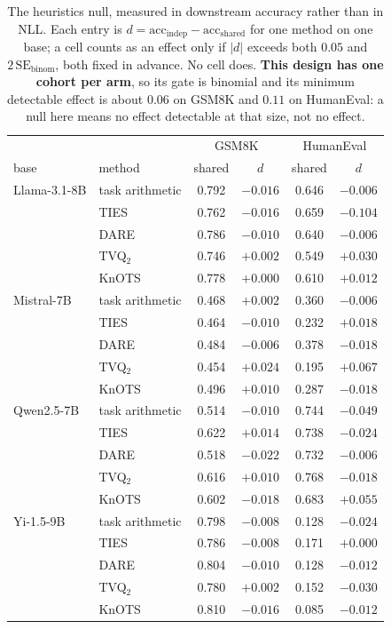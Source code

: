 \begin{table}[t]
\centering
\small
\caption{The heuristics null, measured in downstream accuracy rather than in
NLL. Each entry is $d = \mathrm{acc}_{\mathrm{indep}} -
\mathrm{acc}_{\mathrm{shared}}$ for one method on one base; a cell counts as an
effect only if $|d|$ exceeds both $0.05$ and $2\,\mathrm{SE}_{\mathrm{binom}}$,
both fixed in advance. No cell does. \textbf{This design has one cohort per
arm}, so its gate is binomial and its minimum detectable effect is about
$0.06$ on GSM8K and $0.11$ on HumanEval: a null here means no effect detectable
at that size, not no effect.}
\label{tab:heur-downstream}
\begin{tabular}{llcccc}
\toprule
 & & \multicolumn{2}{c}{GSM8K} & \multicolumn{2}{c}{HumanEval} \\
base & method & shared & $d$ & shared & $d$ \\
\midrule
Llama-3.1-8B & task arithmetic & 0.792 & $-0.016$ & 0.646 & $-0.006$ \\
 & TIES & 0.762 & $-0.016$ & 0.659 & $-0.104$ \\
 & DARE & 0.786 & $-0.010$ & 0.640 & $-0.006$ \\
 & TVQ$_2$ & 0.746 & $+0.002$ & 0.549 & $+0.030$ \\
 & KnOTS & 0.778 & $+0.000$ & 0.610 & $+0.012$ \\
\addlinespace
Mistral-7B & task arithmetic & 0.468 & $+0.002$ & 0.360 & $-0.006$ \\
 & TIES & 0.464 & $-0.010$ & 0.232 & $+0.018$ \\
 & DARE & 0.484 & $-0.006$ & 0.378 & $-0.018$ \\
 & TVQ$_2$ & 0.454 & $+0.024$ & 0.195 & $+0.067$ \\
 & KnOTS & 0.496 & $+0.010$ & 0.287 & $-0.018$ \\
\addlinespace
Qwen2.5-7B & task arithmetic & 0.514 & $-0.010$ & 0.744 & $-0.049$ \\
 & TIES & 0.622 & $+0.014$ & 0.738 & $-0.024$ \\
 & DARE & 0.518 & $-0.022$ & 0.732 & $-0.006$ \\
 & TVQ$_2$ & 0.616 & $+0.010$ & 0.768 & $-0.018$ \\
 & KnOTS & 0.602 & $-0.018$ & 0.683 & $+0.055$ \\
\addlinespace
Yi-1.5-9B & task arithmetic & 0.798 & $-0.008$ & 0.128 & $-0.024$ \\
 & TIES & 0.786 & $-0.008$ & 0.171 & $+0.000$ \\
 & DARE & 0.804 & $-0.010$ & 0.128 & $-0.012$ \\
 & TVQ$_2$ & 0.780 & $+0.002$ & 0.152 & $-0.030$ \\
 & KnOTS & 0.810 & $-0.016$ & 0.085 & $-0.012$ \\
\bottomrule
\end{tabular}
\end{table}

